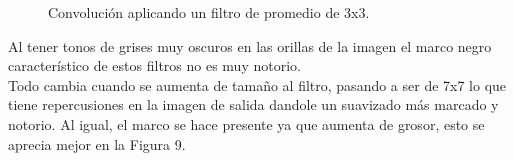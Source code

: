 \documentclass[conference]{IEEEtran}
\begin{document}
\begin{figure}[h]
	\centering
	\caption{Convoluci\'on aplicando un filtro de promedio de 3x3.}
\end{figure}

Al tener tonos de grises muy oscuros en las orillas de la imagen el marco negro caracter\'istico de estos filtros no es muy notorio.\\
Todo cambia cuando se aumenta de tama\~no al filtro, pasando a ser de 7x7 lo que tiene repercusiones en la imagen de salida dandole un suavizado m\'as marcado y notorio. Al igual, el marco se hace presente ya que aumenta de grosor, esto se aprecia mejor en la Figura 9.
\end{document}
